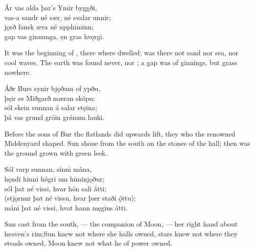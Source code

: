 \bva Ár vas alda \hld þar’s Ymir byggði,\footnotemark[1] \\%
vas-a sandr né sær, \hld né svalar unnir; \\%
jǫrð fansk æva \hld né upphiminn; \\%
gap vas ginnunga, \hld ęn gras hvęrgi.\eva
{}

\bvb It was the beginning of , there where  dwelled\footnotemark[1]; was there not sand nor sea, nor cool waves. The earth was found never, nor ; a gap was of ginnings\footnotemark[2], but grass nowhere.\evb
{}

\bva Áðr Burs synir \hld bjǫðum of ypðu, \\%
þęir es Miðgarð \hld mæran skópu; \\%
sól skein sunnan \hld á salar stęina; \\%
þá vas grund gróin \hld grǿnum lauki.\eva

\bvb Before the sons of Bur the flatlands did upwards lift, they who the renowned Middenyard shaped. Sun shone from the south on the stones of the hall; then was the ground grown with green leek.\footnotemark[1]\evb
{}

\bva Sól varp sunnan, \hld sinni mána,\footnotemark[1] \\%
hęndi hinni hǿgri \hld um himinjǫður; \\%
sól þat né vissi, \hld hvar hón sali átti; \\%
(stjǫrnur þat né vissu, \hld hvar þær staði ǫ́ttu); \\%
máni þat né vissi, \hld hvat hann męgins átti.\eva
{}

\bvb Sun cast from the south, — the companion of Moon, — her right hand about heaven’s rim;\footnotemark[1] Sun knew not where she halls owned, stars knew not where they steads owned, Moon knew not what he of power owned.\evb
{}


